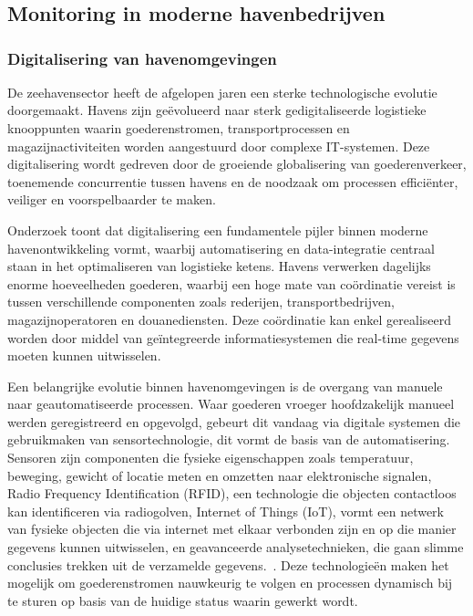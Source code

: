 \chapter{}%
\label{ch:stand-van-zaken}
\section{Monitoring in moderne havenbedrijven}

\subsection{Digitalisering van havenomgevingen}

De zeehavensector heeft de afgelopen jaren een sterke technologische evolutie doorgemaakt. Havens zijn geëvolueerd naar sterk gedigitaliseerde logistieke knooppunten waarin goederenstromen, transportprocessen en magazijnactiviteiten worden aangestuurd door complexe IT-systemen. Deze digitalisering wordt gedreven door de groeiende globalisering van goederenverkeer, toenemende concurrentie tussen havens en de noodzaak om processen efficiënter, veiliger en voorspelbaarder te maken.

Onderzoek toont dat digitalisering een fundamentele pijler binnen moderne havenontwikkeling vormt, waarbij automatisering en data-integratie centraal staan in het optimaliseren van logistieke ketens. Havens verwerken dagelijks enorme hoeveelheden goederen, waarbij een hoge mate van coördinatie vereist is tussen verschillende componenten zoals rederijen, transportbedrijven, magazijnoperatoren en douanediensten. Deze coördinatie kan enkel gerealiseerd worden door middel van geïntegreerde informatiesystemen die real-time gegevens moeten kunnen uitwisselen.

Een belangrijke evolutie binnen havenomgevingen is de overgang van manuele naar geautomatiseerde processen. Waar goederen vroeger hoofdzakelijk manueel werden geregistreerd en opgevolgd, gebeurt dit vandaag via digitale systemen die gebruikmaken van sensortechnologie, dit vormt de basis van de automatisering. Sensoren zijn componenten die fysieke eigenschappen zoals temperatuur, beweging, gewicht of locatie meten en omzetten naar elektronische signalen, Radio Frequency Identification (RFID), een technologie die objecten contactloos kan identificeren via radiogolven, Internet of Things (IoT), vormt een netwerk van fysieke objecten die via internet met elkaar verbonden zijn en op die manier gegevens kunnen uitwisselen, en geavanceerde analysetechnieken, die gaan slimme conclusies trekken uit de verzamelde gegevens.~\autocite{Rodrigue2024}. Deze technologieën maken het mogelijk om goederenstromen nauwkeurig te volgen en processen dynamisch bij te sturen op basis van de huidige status waarin gewerkt wordt.

